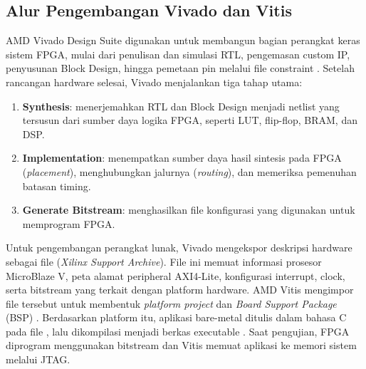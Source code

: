 \subsection{Alur Pengembangan Vivado dan Vitis}

AMD Vivado Design Suite digunakan untuk membangun bagian perangkat keras sistem FPGA, mulai dari penulisan dan simulasi RTL, pengemasan custom IP, penyusunan Block Design, hingga pemetaan pin melalui file constraint  \citep{xilinx_vivado_design_suite_2021}. Setelah rancangan hardware selesai, Vivado menjalankan tiga tahap utama:
\begin{enumerate}
    \item \textbf{Synthesis}: menerjemahkan RTL dan Block Design menjadi netlist yang tersusun dari sumber daya logika FPGA, seperti LUT, flip-flop, BRAM, dan DSP.
    \item \textbf{Implementation}: menempatkan sumber daya hasil sintesis pada FPGA (\textit{placement}), menghubungkan jalurnya (\textit{routing}), dan memeriksa pemenuhan batasan timing.
    \item \textbf{Generate Bitstream}: menghasilkan file konfigurasi  yang digunakan untuk memprogram FPGA.
\end{enumerate}

Untuk pengembangan perangkat lunak, Vivado mengekspor deskripsi hardware sebagai file  (\textit{Xilinx Support Archive}). File ini memuat informasi prosesor MicroBlaze V, peta alamat peripheral AXI4-Lite, konfigurasi interrupt, clock, serta bitstream yang terkait dengan platform hardware. AMD Vitis mengimpor file  tersebut untuk membentuk \textit{platform project} dan \textit{Board Support Package} (BSP) \citep{xilinx_vitis_embedded_2021}. Berdasarkan platform itu, aplikasi bare-metal ditulis dalam bahasa C pada file , lalu dikompilasi menjadi berkas executable . Saat pengujian, FPGA diprogram menggunakan bitstream dan Vitis memuat aplikasi  ke memori sistem melalui JTAG.

